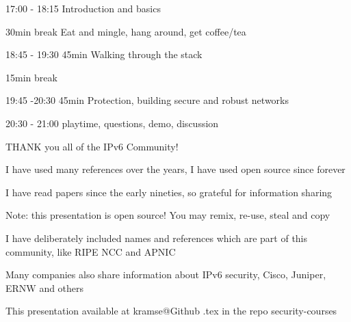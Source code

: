 \documentclass[Screen16to9,17pt]{foils}
\begin{document}


\begin{list2}
\item 17:00 - 18:15  Introduction and basics\\

\item 30min break  Eat and mingle, hang around, get coffee/tea\\

\item 18:45 - 19:30 45min Walking through the stack\\

\item 15min break\\

\item 19:45 -20:30 45min Protection, building secure and robust networks\\

\item 20:30 - 21:00 playtime, questions, demo, discussion
\end{list2}

\hlkprofiluk



\slide{}


\vskip 5mm
\centerline{{\color{red}\faHeart} THANK you all of the IPv6 Community! {\color{red}\faHeart}}

\begin{list2}
\item I have used many references over the years, I have used open source since forever
\item I have read papers since the early nineties, so grateful for information sharing
\item Note: this presentation is open source! You may remix, re-use, steal and copy
\item I have deliberately included names and references which are part of this community, like RIPE NCC and APNIC
\item Many companies also share information about IPv6 security, Cisco, Juniper, ERNW and others
\item This presentation available at kramse@Github \jobname.tex in the repo security-courses
\end{list2}
\end{document}
